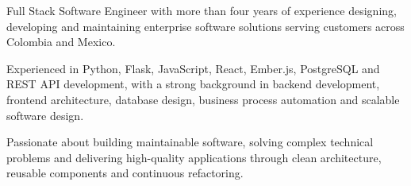 
\begin{cvparagraph}
Full Stack Software Engineer with more than four years of experience designing, developing and maintaining enterprise software solutions serving customers across Colombia and Mexico.

Experienced in Python, Flask, JavaScript, React, Ember.js, PostgreSQL and REST API development, with a strong background in backend development, frontend architecture, database design, business process automation and scalable software design.

Passionate about building maintainable software, solving complex technical problems and delivering high-quality applications through clean architecture, reusable components and continuous refactoring.
\end{cvparagraph}